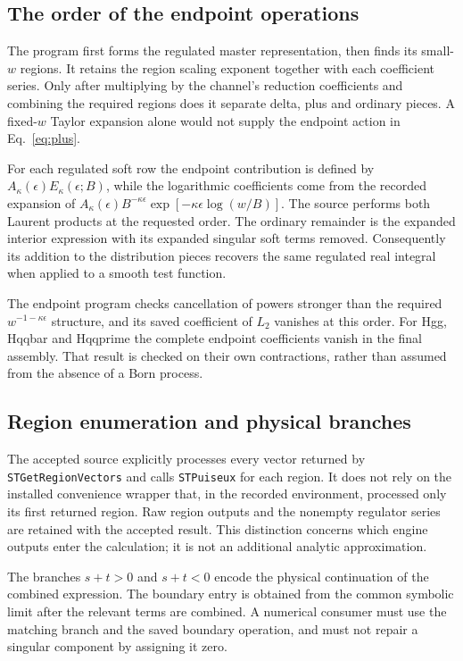\documentclass[11pt,a4paper]{article}
\newcommand{\eps}{\epsilon}
\begin{document}
\subsection{The order of the endpoint operations}

The program first forms the regulated master representation, then finds
its small-$w$ regions. It retains the region scaling exponent together
with each coefficient series. Only after multiplying by the channel's
reduction coefficients and combining the required regions does it
separate delta, plus and ordinary pieces. A fixed-$w$ Taylor expansion
alone would not supply the endpoint action in Eq.~\eqref{eq:plus}.

For each regulated soft row the endpoint contribution is defined by
$A_\kappa(\eps)E_\kappa(\eps;B)$, while the logarithmic coefficients
come from the recorded expansion of
$A_\kappa(\eps)B^{-\kappa\eps}
\exp[-\kappa\eps\log(w/B)]$. The source performs both Laurent
products at the requested order. The ordinary remainder is the expanded
interior expression with its expanded singular soft terms removed.
Consequently its addition to the distribution pieces recovers the same
regulated real integral when applied to a smooth test function.

The endpoint program checks cancellation of powers stronger than the
required $w^{-1-\kappa\eps}$ structure, and its saved coefficient of
$L_2$ vanishes at this order. For Hgg, Hqqbar and Hqqprime the complete
endpoint coefficients vanish in the final assembly. That result is
checked on their own contractions, rather than assumed from the absence
of a Born process.

\subsection{Region enumeration and physical branches}

The accepted source explicitly processes every vector returned by
\texttt{STGetRegionVectors} and calls \texttt{STPuiseux} for each
region. It does not rely on the installed convenience wrapper that, in
the recorded environment, processed only its first returned region.
Raw region outputs and the nonempty regulator series are retained with
the accepted result. This distinction concerns which engine outputs
enter the calculation; it is not an additional analytic approximation.

The branches $s+t>0$ and $s+t<0$ encode the physical continuation of
the combined expression. The boundary entry is obtained from the common
symbolic limit after the relevant terms are combined. A numerical
consumer must use the matching branch and the saved boundary operation,
and must not repair a singular component by assigning it zero.
\end{document}
